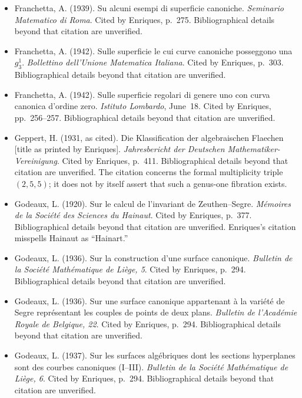 \begin{sloppypar}
\begin{itemize}
\item Franchetta, A. (1939). Su alcuni esempi di superficie canoniche. \emph{Seminario Matematico di Roma}. Cited by Enriques, p.~275. Bibliographical details beyond that citation are unverified.

\item Franchetta, A. (1942). Sulle superficie le cui curve canoniche posseggono una $g^1_3$. \emph{Bollettino dell'Unione Matematica Italiana}. Cited by Enriques, p.~303. Bibliographical details beyond that citation are unverified.

\item Franchetta, A. (1942). Sulle superficie regolari di genere uno con curva canonica d'ordine zero. \emph{Istituto Lombardo}, June~18. Cited by Enriques, pp.~256--257. Bibliographical details beyond that citation are unverified.

\item Geppert, H. (1931, as cited). Die Klassification der algebraischen Flaechen [title as printed by Enriques]. \emph{Jahresbericht der Deutschen Mathematiker-Vereinigung}. Cited by Enriques, p.~411. Bibliographical details beyond that citation are unverified. The citation concerns the formal multiplicity triple $(2,5,5)$; it does not by itself assert that such a genus-one fibration exists.

\item Godeaux, L. (1920). Sur le calcul de l'invariant de Zeuthen--Segre. \emph{Mémoires de la Société des Sciences du Hainaut}. Cited by Enriques, p.~377. Bibliographical details beyond that citation are unverified. Enriques's citation misspells Hainaut as ``Hainart.''

\item Godeaux, L. (1936). Sur la construction d'une surface canonique. \emph{Bulletin de la Société Mathématique de Liège, 5}. Cited by Enriques, p.~294. Bibliographical details beyond that citation are unverified.

\item Godeaux, L. (1936). Sur une surface canonique appartenant à la variété de Segre représentant les couples de points de deux plans. \emph{Bulletin de l'Académie Royale de Belgique, 22}. Cited by Enriques, p.~294. Bibliographical details beyond that citation are unverified.

\item Godeaux, L. (1937). Sur les surfaces algébriques dont les sections hyperplanes sont des courbes canoniques (I--III). \emph{Bulletin de la Société Mathématique de Liège, 6}. Cited by Enriques, p.~294. Bibliographical details beyond that citation are unverified.


\end{itemize}
\end{sloppypar}
